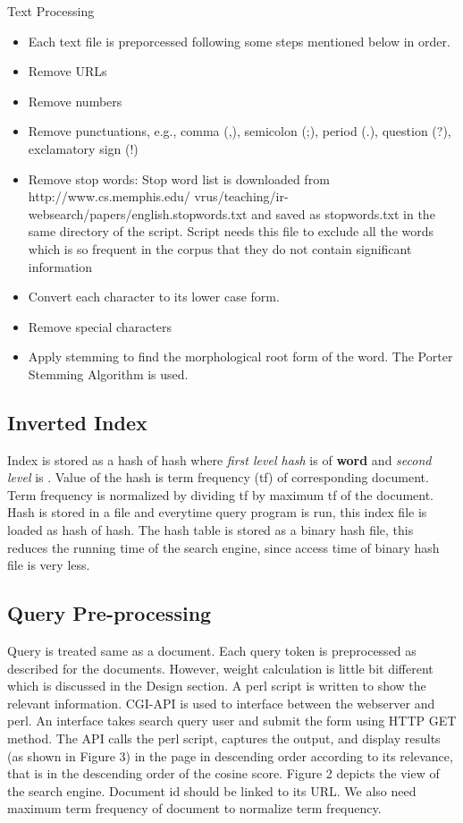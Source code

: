 Text Processing
\begin{itemize}
\item Each text file is preporcessed following some steps mentioned below in order.
\item Remove URLs
\item Remove numbers
\item Remove punctuations, e.g., comma (,), semicolon (;), period (.), question (?), exclamatory
sign (!)
\item Remove stop words: Stop word list is downloaded from http://www.cs.memphis.edu/
vrus/teaching/ir-websearch/papers/english.stopwords.txt and saved as stopwords.txt in
the same directory of the script. Script needs this file to exclude all the words which is so
frequent in the corpus that they do not contain significant information
\item Convert each character to its lower case form.
\item Remove special characters
\item Apply stemming to find the morphological root form of the word. The Porter Stemming Algorithm is used.
\end{itemize}

\subsection{Inverted Index}
Index is stored as a hash of hash where \textit{first level hash} is of \textbf{word} and \textit{second level} is . Value of the hash is term frequency (tf) of corresponding document. Term frequency is normalized by dividing tf by maximum tf of the document. Hash is stored in a file and everytime query program is run, this index file is loaded as hash of hash. The hash table is stored as a binary hash file, this reduces the running time of the search engine, since access time of binary hash file is very less.

\subsection{Query Pre-processing}
Query is treated same as a document. Each query token is preprocessed as described for the
documents. However, weight calculation is little bit different which is discussed in the Design
section. A perl script is written to show the relevant information. CGI-API is used to interface
between the webserver and perl. An interface takes search query user and submit the form using
HTTP GET method. The API calls the perl script, captures the output, and display results (as
shown in Figure 3) in the page in descending order according to its relevance, that is in the
descending order of the cosine score. Figure 2 depicts the view of the search engine. Document
id should be linked to its URL. We also need maximum term frequency of document to
normalize term frequency.